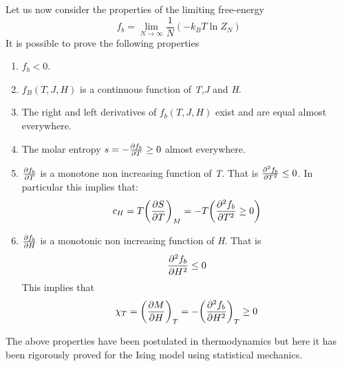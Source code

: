 \documentclass[../main/main.tex]{subfiles}
\begin{document}
Let us now consider the properties of the limiting free-energy
\begin{equation}
  f_b = \lim_{N \rightarrow \infty } \frac{1}{N} (-k_B T \ln{Z_N} )
\end{equation}
It is possible to prove the following properties
\begin{enumerate}
\item \( f_b < 0 \).
\item \( f_B (T,J,H) \) is a continuous function of \emph{T,J} and \emph{H}.
\item The right and left derivatives of \( f_b (T,J,H) \) exist and are equal almost everywhere.
\item The molar entropy \( s = - \pdv{f_b}{T} \ge 0\)    almost everywhere.
\item \( \pdv{f_b}{T}  \) is a monotone non increasing function of \emph{T}. That is \( \pdv[2]{f_b}{T} \le  0 \). In particular this implies that:
\begin{equation}
  c_H = T \qty(\pdv{S}{T} )_M = - T \qty(\pdv[2]{f_b}{T} \ge 0)
\end{equation}
\item \( \pdv{f_b}{H}  \) is a monotonic non increasing function of \emph{H}. That is
\begin{equation}
  \pdv[2]{f_b}{H} \le 0
\end{equation}
This implies that
\begin{equation}
  \chi _T = \qty(\pdv{M}{H} )_T = - \qty(\pdv[2]{f_b}{H})_T \ge 0
\end{equation}
\end{enumerate}
\begin{remark}
The above properties have been postulated in thermodynamics but here it has been rigorously proved for the Ising model using statistical mechanics.
\end{remark}
\end{document}
